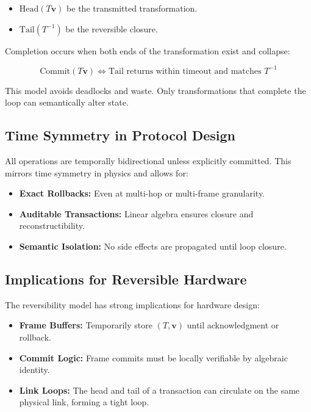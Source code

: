 \begin{itemize}
  \item $\text{Head}(T\mathbf{v})$ be the transmitted transformation.
  \item $\text{Tail}(T^{-1})$ be the reversible closure.
\end{itemize}

Completion occurs when both ends of the transformation exist and collapse:

\[
\text{Commit}(T\mathbf{v}) \iff \text{Tail returns within timeout and matches } T^{-1}
\]

This model avoids deadlocks and waste. Only transformations that complete the loop can semantically alter state.

\subsection*{Time Symmetry in Protocol Design}

All operations are temporally bidirectional unless explicitly committed. This mirrors time symmetry in physics and allows for:

\begin{itemize}
  \item \textbf{Exact Rollbacks:} Even at multi-hop or multi-frame granularity.
  \item \textbf{Auditable Transactions:} Linear algebra ensures closure and reconstructibility.
  \item \textbf{Semantic Isolation:} No side effects are propagated until loop closure.
\end{itemize}

\subsection*{Implications for Reversible Hardware}

The reversibility model has strong implications for hardware design:

\begin{itemize}
  \item \textbf{Frame Buffers:} Temporarily store $(T, \mathbf{v})$ until acknowledgment or rollback.
  \item \textbf{Commit Logic:} Frame commits must be locally verifiable by algebraic identity.
  \item \textbf{Link Loops:} The head and tail of a transaction can circulate on the same physical link, forming a tight loop.
\end{itemize}

